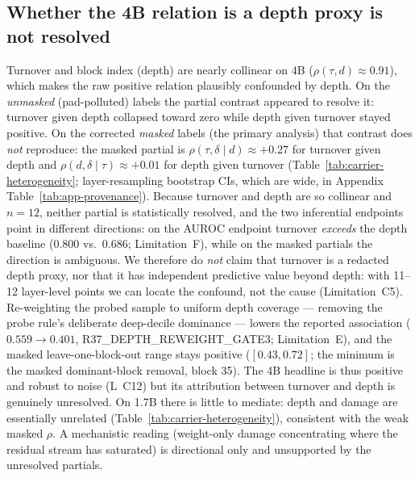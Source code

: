 \documentclass{article}
\begin{document}
\subsection{Whether the 4B relation is a depth proxy is not resolved}
\label{sec:results-depth}
Turnover and block index (depth) are nearly collinear on 4B ($\rho(\tau,d)\approx0.91$),
which makes the raw positive relation plausibly confounded by depth. On the \emph{unmasked}
(pad-polluted) labels the partial contrast appeared to resolve it: turnover given depth
collapsed toward zero while depth given turnover stayed positive. On the corrected
\emph{masked} labels (the primary analysis) that contrast does \emph{not} reproduce: the masked
partial is $\rho(\tau,\delta\mid d)\approx+0.27$ for turnover given depth and
$\rho(d,\delta\mid\tau)\approx+0.01$ for depth given turnover
(Table~\ref{tab:carrier-heterogeneity}; layer-resampling bootstrap CIs, which are wide, in
Appendix Table~\ref{tab:app-provenance}). Because turnover and depth are so collinear and
$n{=}12$, neither partial is statistically resolved, and the two inferential endpoints point in
different directions: on the AUROC endpoint turnover \emph{exceeds} the depth baseline
($0.800$ vs.\ $0.686$; Limitation~F), while on the masked partials the direction is ambiguous.
We therefore do \emph{not} claim that turnover is a redacted depth proxy, nor that it has
independent predictive value beyond depth: with 11--12 layer-level points we can locate the
confound, not the cause (Limitation~C5). Re-weighting the probed sample to uniform depth
coverage --- removing the probe rule's deliberate deep-decile dominance --- lowers the reported
association ($0.559\to0.401$, R37\_DEPTH\_REWEIGHT\_GATE3;
Limitation~E), and the masked leave-one-block-out range stays positive
($[0.43,0.72]$; the minimum is the masked dominant-block removal, block 35). The 4B headline
is thus positive and robust to noise (L~C12) but its attribution between turnover and depth is
genuinely unresolved. On 1.7B there is little to mediate: depth and damage are essentially
unrelated (Table~\ref{tab:carrier-heterogeneity}), consistent with the weak masked $\rho$. A
mechanistic reading (weight-only damage concentrating where the residual stream has saturated)
is directional only and unsupported by the unresolved partials.
\end{document}

